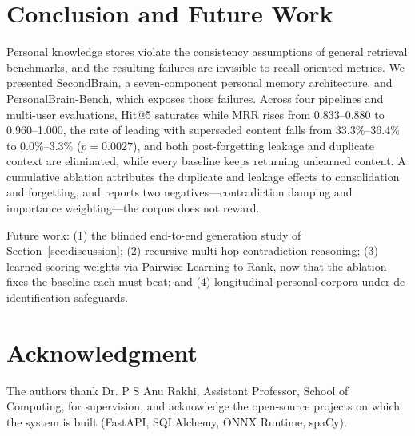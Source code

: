\documentclass[conference]{IEEEtran}
\begin{document}
\section{Conclusion and Future Work}
Personal knowledge stores violate the consistency assumptions of general retrieval benchmarks, and the resulting failures are invisible to recall-oriented metrics. We presented SecondBrain, a seven-component personal memory architecture, and PersonalBrain-Bench, which exposes those failures. Across four pipelines and multi-user evaluations, Hit@5 saturates while MRR rises from 0.833--0.880 to 0.960--1.000, the rate of leading with superseded content falls from 33.3\%--36.4\% to 0.0\%--3.3\% ($p = 0.0027$), and both post-forgetting leakage and duplicate context are eliminated, while every baseline keeps returning unlearned content. A cumulative ablation attributes the duplicate and leakage effects to consolidation and forgetting, and reports two negatives---contradiction damping and importance weighting---the corpus does not reward.

Future work: (1) the blinded end-to-end generation study of Section~\ref{sec:discussion}; (2) recursive multi-hop contradiction reasoning; (3) learned scoring weights via Pairwise Learning-to-Rank, now that the ablation fixes the baseline each must beat; and (4) longitudinal personal corpora under de-identification safeguards.

\enlargethispage{3\baselineskip}

\section*{Acknowledgment}
The authors thank Dr. P S Anu Rakhi, Assistant Professor, School of Computing, for supervision, and acknowledge the open-source projects on which the system is built (FastAPI, SQLAlchemy, ONNX Runtime, spaCy).
\end{document}
